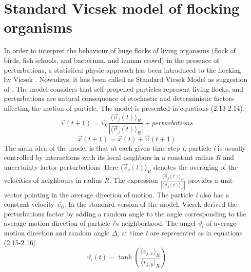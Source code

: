 \documentclass[a4paper,11pt,phdthesis,singlespace,twoside]{cssethesis}
\begin{document}
\section{Standard Vicsek model of flocking organisms}
In order to interpret the behaviour of huge flocks of living organisms (flock of birds, fish schools, and bacterium, and human crowd) in the presence of perturbations, a statistical physic approach has been introduced to the flocking by Vicsek \cite{Vicsek1995}. Nowadays, it has been called as Standard Vicsek Model as suggestion of \cite{Huepe2008}. The model considers that self-propelled particles represent living flocks, and perturbations are natural consequence of stochastic and deterministic factors affecting the motion of particle. The model is presented in equations (2.13-2.14).
\begin{equation}
\vec{v}(t+1)= \vec{v}_{0}\frac{\langle\vec{v}_{j}(t)\rangle_{R}}{|\langle\vec{v}_{j}(t)\rangle_{R}|} + \textit{perturbations}
\end{equation}
\begin{equation}
\vec{x}(t+1)= \vec{x}(t) + \vec{v}(t+1)
\end{equation}
The main idea of the model is that at each given time step \textit{t}, particle \textit{i} is usually controlled by interactions with its local neighbors in a constant radius \textit{R} and uncertainty factor perturbations. Here \begin{math}\langle\vec{v}_{j}(t)\rangle_{R} \end{math} denotes the averaging of the velocities of neighbours in radius \textit{R}. The expression \begin{math} \frac{\langle\vec{v}_{j}(t)\rangle_{R}}{|\langle\vec{v}_{j}(t)\rangle_{R}|}\end{math} provides a unit vector pointing in the average direction of motion. The particle \textit{i} also has a constant velocity \begin{math} \vec{v}_{0} \end{math}. In the standard version of the model, Vicsek derived the perturbations factor by adding a random angle to the angle corresponding to the average motion direction of particle \textit{i}'s neighborhood. The angel \begin{math} \vartheta_{i} \end{math} of average motion direction and random angle $\Delta_{i}$ at time \textit{t} are represented as in equations (2.15-2.16).
\begin{equation}
\vartheta_{i}(t)= \tanh\left(\frac{\langle v_{j,x}\rangle_{R}}{\langle v_{j,y}\rangle_{R}}\right)
\end{equation}
\end{document}
